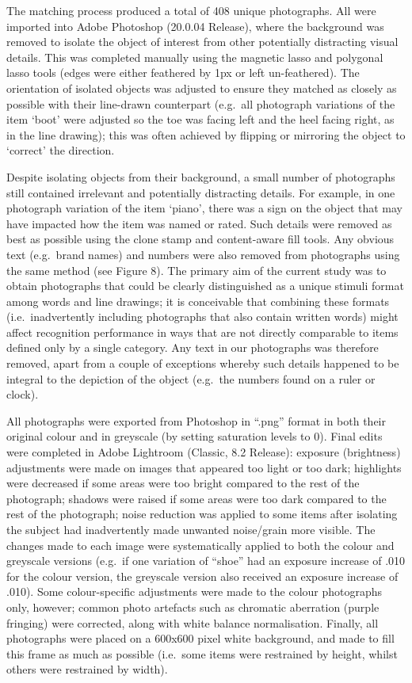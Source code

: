 \documentclass[
  11pt,
]{article}
\begin{document}
The matching process produced a total of 408 unique photographs. All
were imported into Adobe Photoshop (20.0.04 Release), where the
background was removed to isolate the object of interest from other
potentially distracting visual details. This was completed manually
using the magnetic lasso and polygonal lasso tools (edges were either
feathered by 1px or left un-feathered). The orientation of isolated
objects was adjusted to ensure they matched as closely as possible with
their line-drawn counterpart (e.g.~all photograph variations of the item
`boot' were adjusted so the toe was facing left and the heel facing
right, as in the line drawing); this was often achieved by flipping or
mirroring the object to `correct' the direction.

Despite isolating objects from their background, a small number of
photographs still contained irrelevant and potentially distracting
details. For example, in one photograph variation of the item `piano',
there was a sign on the object that may have impacted how the item was
named or rated. Such details were removed as best as possible using the
clone stamp and content-aware fill tools. Any obvious text (e.g.~brand
names) and numbers were also removed from photographs using the same
method (see Figure 8). The primary aim of the current study was to
obtain photographs that could be clearly distinguished as a unique
stimuli format among words and line drawings; it is conceivable that
combining these formats (i.e.~inadvertently including photographs that
also contain written words) might affect recognition performance in ways
that are not directly comparable to items defined only by a single
category. Any text in our photographs was therefore removed, apart from
a couple of exceptions whereby such details happened to be integral to
the depiction of the object (e.g.~the numbers found on a ruler or
clock).

All photographs were exported from Photoshop in ``.png'' format in both
their original colour and in greyscale (by setting saturation levels to
0). Final edits were completed in Adobe Lightroom (Classic, 8.2
Release): exposure (brightness) adjustments were made on images that
appeared too light or too dark; highlights were decreased if some areas
were too bright compared to the rest of the photograph; shadows were
raised if some areas were too dark compared to the rest of the
photograph; noise reduction was applied to some items after isolating
the subject had inadvertently made unwanted noise/grain more visible.
The changes made to each image were systematically applied to both the
colour and greyscale versions (e.g.~if one variation of ``shoe'' had an
exposure increase of .010 for the colour version, the greyscale version
also received an exposure increase of .010). Some colour-specific
adjustments were made to the colour photographs only, however; common
photo artefacts such as chromatic aberration (purple fringing) were
corrected, along with white balance normalisation. Finally, all
photographs were placed on a 600x600 pixel white background, and made to
fill this frame as much as possible (i.e.~some items were restrained by
height, whilst others were restrained by width).
\end{document}
